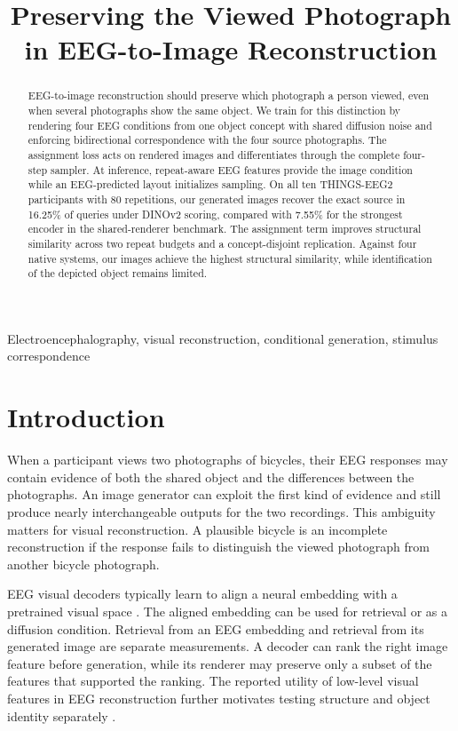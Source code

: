\documentclass[letterpaper,10pt,conference]{IEEEtran}
\begin{document}
\title{Preserving the Viewed Photograph in EEG-to-Image Reconstruction}
\author{}
\maketitle

\begin{abstract}
EEG-to-image reconstruction should preserve which photograph a person viewed, even when several photographs show the same object. We train for this distinction by rendering four EEG conditions from one object concept with shared diffusion noise and enforcing bidirectional correspondence with the four source photographs. The assignment loss acts on rendered images and differentiates through the complete four-step sampler. At inference, repeat-aware EEG features provide the image condition while an EEG-predicted layout initializes sampling. On all ten THINGS-EEG2 participants with 80 repetitions, our generated images recover the exact source in 16.25\% of queries under DINOv2 scoring, compared with 7.55\% for the strongest encoder in the shared-renderer benchmark. The assignment term improves structural similarity across two repeat budgets and a concept-disjoint replication. Against four native systems, our images achieve the highest structural similarity, while identification of the depicted object remains limited.
\end{abstract}

\begin{IEEEkeywords}
Electroencephalography, visual reconstruction, conditional generation, stimulus correspondence
\end{IEEEkeywords}

\section{Introduction}

When a participant views two photographs of bicycles, their EEG responses may contain evidence of both the shared object and the differences between the photographs. An image generator can exploit the first kind of evidence and still produce nearly interchangeable outputs for the two recordings. This ambiguity matters for visual reconstruction. A plausible bicycle is an incomplete reconstruction if the response fails to distinguish the viewed photograph from another bicycle photograph.

EEG visual decoders typically learn to align a neural embedding with a pretrained visual space \cite{song2024,li2024,zheng2026}. The aligned embedding can be used for retrieval or as a diffusion condition. Retrieval from an EEG embedding and retrieval from its generated image are separate measurements. A decoder can rank the right image feature before generation, while its renderer may preserve only a subset of the features that supported the ranking. The reported utility of low-level visual features in EEG reconstruction further motivates testing structure and object identity separately \cite{yang2025}.
\end{document}
